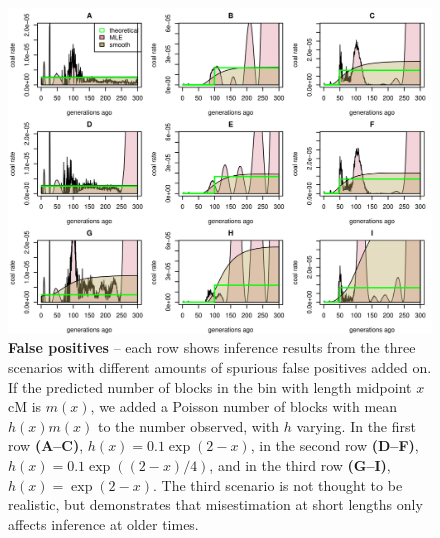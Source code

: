 \documentclass{article}
\begin{document}
\begin{figure}[htp!]
\begin{center}
\includegraphics{fp-inversions}
\caption{
\label{fig:fp_inversions}
{\bf False positives} -- each row shows inference results from the three scenarios with different amounts of spurious false positives added on.
If the predicted number of blocks in the bin with length midpoint $x$cM is $m(x)$,
we added a Poisson number of blocks with mean $h(x)m(x)$ to the number observed, with $h$ varying.
In the first row {\bf(A--C)}, $h(x) = 0.1\exp(2-x)$,
in the second row {\bf(D--F)}, $h(x) = 0.1\exp((2-x)/4)$,
and in the third row {\bf (G--I)}, $h(x) = \exp(2-x)$.
The third scenario is not thought to be realistic,
but demonstrates that misestimation at short lengths only affects inference at older times.
}
\end{center}
\end{figure}
\end{document}
